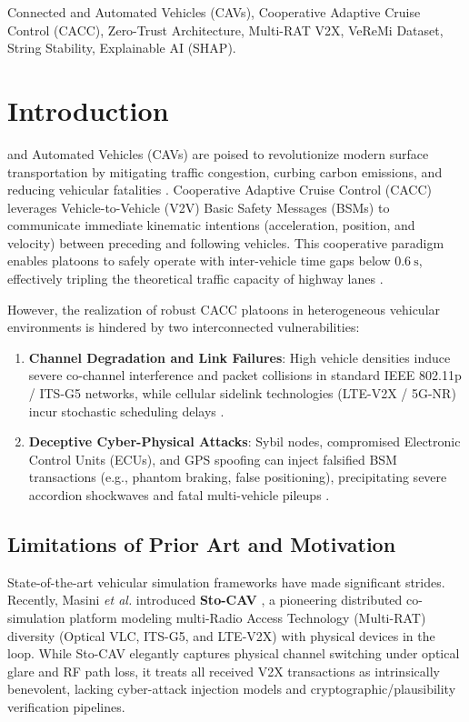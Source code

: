 \documentclass[journal]{IEEEtran}
\begin{document}
\begin{IEEEkeywords}
Connected and Automated Vehicles (CAVs), Cooperative Adaptive Cruise Control (CACC), Zero-Trust Architecture, Multi-RAT V2X, VeReMi Dataset, String Stability, Explainable AI (SHAP).
\end{IEEEkeywords}

\section{Introduction}
 and Automated Vehicles (CAVs) are poised to revolutionize modern surface transportation by mitigating traffic congestion, curbing carbon emissions, and reducing vehicular fatalities \cite{milanes2014cooperative}. Cooperative Adaptive Cruise Control (CACC) leverages Vehicle-to-Vehicle (V2V) Basic Safety Messages (BSMs) to communicate immediate kinematic intentions (acceleration, position, and velocity) between preceding and following vehicles. This cooperative paradigm enables platoons to safely operate with inter-vehicle time gaps below $0.6~\text{s}$, effectively tripling the theoretical traffic capacity of highway lanes \cite{ploeg2014cacc, rajamani2000cacc}.

However, the realization of robust CACC platoons in heterogeneous vehicular environments is hindered by two interconnected vulnerabilities:
\begin{enumerate}
    \item \textbf{Channel Degradation and Link Failures}: High vehicle densities induce severe co-channel interference and packet collisions in standard IEEE 802.11p / ITS-G5 networks, while cellular sidelink technologies (LTE-V2X / 5G-NR) incur stochastic scheduling delays \cite{abboud2016interworking, storck20205g}.
    \item \textbf{Deceptive Cyber-Physical Attacks}: Sybil nodes, compromised Electronic Control Units (ECUs), and GPS spoofing can inject falsified BSM transactions (e.g., phantom braking, false positioning), precipitating severe accordion shockwaves and fatal multi-vehicle pileups \cite{vanderheijden2018veremi, ghaffari2022cyber}.
\end{enumerate}

\subsection{Limitations of Prior Art and Motivation}
State-of-the-art vehicular simulation frameworks have made significant strides. Recently, Masini \textit{et al.} introduced \textbf{Sto-CAV} \cite{masini2025stocav}, a pioneering distributed co-simulation platform modeling multi-Radio Access Technology (Multi-RAT) diversity (Optical VLC, ITS-G5, and LTE-V2X) with physical devices in the loop. While Sto-CAV elegantly captures physical channel switching under optical glare and RF path loss, it treats all received V2X transactions as intrinsically benevolent, lacking cyber-attack injection models and cryptographic/plausibility verification pipelines.
\end{document}
